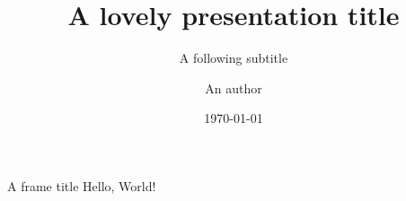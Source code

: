 \documentclass{beamer}
\author{An author}
\title{A lovely presentation title}
\subtitle{A following subtitle}
\date{\today}
\begin{document}
\begin{frame}
\maketitle
\end{frame}

\begin{frame}{A frame title}
Hello, World!
\end{frame}
\end{document}
